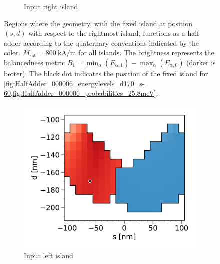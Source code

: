 \documentclass[11pt,a4paper,english,twoside]{article}
\begin{document}
\begin{figure}
\begin{subfigure}[t]{0.594\textwidth}
        \caption{Input right island}
    \label{fig:HalfAdder_000006_sweep_d-s_balanced1-R}
    \end{subfigure}
    \caption{Regions where the geometry, with the fixed island at position $(s, d)$ with respect to the rightmost island, functions as a half adder according to the quaternary conventions indicated by the color. $M_\mathrm{sat} = \SI{800}{\kilo\ampere\per\metre}$ for all islands. The brightness represents the balancedness metric $B_1 = \min_\alpha(E_{\alpha,1}) - \max_\alpha(E_{\alpha,0})$ (darker is better). The black dot indicates the position of the fixed island for \cref{fig:HalfAdder_000006_energylevels_d170_s-60,fig:HalfAdder_000006_probabilities_25.8meV}.}
    \label{fig:HalfAdder_000006_sweep_d-s_balanced1}
\end{figure}
\begin{figure}
    \centering
    \begin{subfigure}[t]{0.396\textwidth}
        \includegraphics[width=\textwidth]{Figures/half_adder/sweep/000006_d-s/table(d100-210_10,s-100-100_10)_balanced2_L.pdf}
        \caption{Input left island}
    \label{fig:HalfAdder_000006_sweep_d-s_balanced2-L}
    \end{subfigure}
    \begin{subfigure}[t]{0.594\textwidth}

\end{subfigure}
\end{figure}
\end{document}
